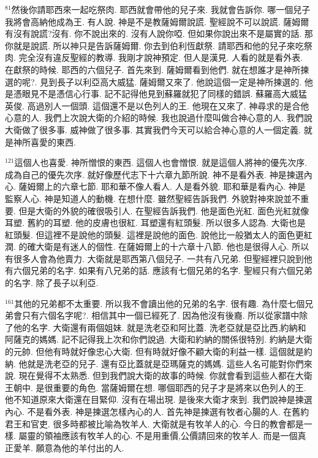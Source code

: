 \documentclass{book}
\begin{document}
$^{81}$然後你請耶西來一起吃祭肉.
耶西就會帶他的兒子來.
我就會告訴你.
哪一個兒子我將會高納他成為王.
有人說.
神是不是教薩姆爾說謊.
聖經說不可以說謊.
薩姆爾有沒有說謊?沒有.
你不說出來的.
沒有人說你啞.
但如果你說出來不是屬實的話.
那你就是說謊.
所以神只是告訴薩姆爾.
你去到伯利恆獻祭.
請耶西和他的兒子來吃祭肉.
完全沒有違反聖經的教導.
我剛才說神預定.
但人是漢見.
人看的就是看外表.
在獻祭的時候.
耶西的六個兒子.
首先來到.
薩姆爾看到他們.
就在想誰才是神所揀選的呢?.
見到長子以利亞高大威猛.
薩姆爾又來了.
他說這個一定是神所揀選的.
他是憑眼見不是憑信心行事.
記不記得他見到蘇羅就犯了同樣的錯誤.
蘇羅高大威猛英俊.
高過別人一個頭.
這個還不是以色列人的王.
他現在又來了.
神尋求的是合他心意的人.
我們上次說大衛的介紹的時候.
我也說過什麼叫做合神心意的人.
我們說大衛做了很多事.
威神做了很多事.
其實我們今天可以給合神心意的人一個定義.
就是神所喜愛的東西.

$^{121}$這個人也喜愛.
神所憎恨的東西.
這個人也會憎恨.
就是這個人將神的優先次序.
成為自己的優先次序.
就好像歷代志下十六章九節所說.
神不是看外表.
神是揀選內心.
薩姆爾上的六章七節.
耶和華不像人看人.
人是看外貌.
耶和華是看內心.
神是監察人心.
神是知道人的動機.
在想什麼.
雖然聖經告訴我們.
外貌對神來說並不重要.
但是大衛的外貌的確很吸引人.
在聖經告訴我們.
他是面色光紅.
面色光紅就像耳塑.
舊約的耳塑.
他的皮膚也很紅.
耳塑還有紅頭髮.
所以很多人認為.
大衛也是紅頭髮.
但這裡不是說他的頭髮.
這裡是說他的面色.
說他比一般猶太人的面色更紅潤.
的確大衛是有迷人的個性.
在薩姆爾上的十六章十八節.
他也是很得人心.
所以有很多人會為他賣力.
大衛就是耶西第八個兒子.
一共有八兄弟.
但聖經裡只說到他有六個兄弟的名字.
如果有八兄弟的話.
應該有七個兄弟的名字.
聖經只有六個兄弟的名字.
除了長子以利亞.

$^{161}$其他的兄弟都不太重要.
所以我不會讀出他的兄弟的名字.
很有趣.
為什麼七個兄弟會只有六個名字呢?.
相信其中一個已經死了.
因為他沒有後裔.
所以從家譜中除了他的名字.
大衛還有兩個姐妹.
就是洗老亞和阿比蓋.
洗老亞就是亞比西,約納和阿薩克的媽媽.
記不記得我上次和你們說過.
大衛和約納的關係很特別.
約納是大衛的元帥.
但他有時就好像忠心大衛.
但有時就好像不顧大衛的利益一樣.
這個就是約納.
他就是洗老亞的兒子.
還有亞比蓋就是亞瑪薩克的媽媽.
這些人名可能對你們來說.
現在覺得不太熟悉.
但到我們說大衛的故事的時候.
你就會看到這些人都在大衛王朝中.
是很重要的角色.
當薩姆爾在想.
哪個耶西的兒子才是將來以色列人的王.
他不知道原來大衛還在目緊仰.
沒有在場出現.
是後來大衛才來到.
我們說神是揀選內心.
不是看外表.
神是揀選怎樣內心的人.
首先神是揀選有牧者心腸的人.
在舊約君王和官吏.
很多時都被比喻為牧羊人.
大衛就是有牧羊人的心.
今日的教會都是一樣.
屬靈的領袖應該有牧羊人的心.
不是用重價,公價請回來的牧羊人.
而是一個真正愛羊.
願意為他的羊付出的人.
\end{document}
